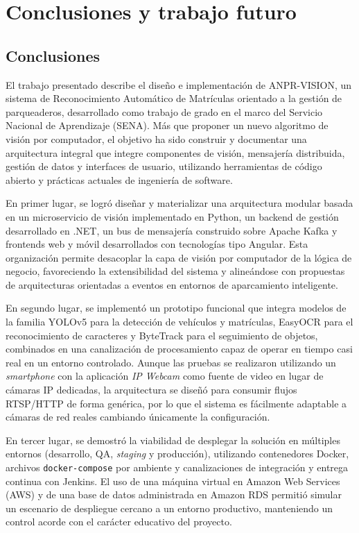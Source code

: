 \section{Conclusiones y trabajo futuro}
\label{sec:conclusiones}

\subsection{Conclusiones}

El trabajo presentado describe el diseño e implementación de ANPR-VISION, un sistema de Reconocimiento Automático de Matrículas orientado a la gestión de parqueaderos, desarrollado como trabajo de grado en el marco del Servicio Nacional de Aprendizaje (SENA). Más que proponer un nuevo algoritmo de visión por computador, el objetivo ha sido construir y documentar una arquitectura integral que integre componentes de visión, mensajería distribuida, gestión de datos y interfaces de usuario, utilizando herramientas de código abierto y prácticas actuales de ingeniería de software.

En primer lugar, se logró diseñar y materializar una arquitectura modular basada en un microservicio de visión implementado en Python, un backend de gestión desarrollado en .NET, un bus de mensajería construido sobre Apache Kafka y frontends web y móvil desarrollados con tecnologías tipo Angular. Esta organización permite desacoplar la capa de visión por computador de la lógica de negocio, favoreciendo la extensibilidad del sistema y alineándose con propuestas de arquitecturas orientadas a eventos en entornos de aparcamiento inteligente.

En segundo lugar, se implementó un prototipo funcional que integra modelos de la familia YOLOv5 para la detección de vehículos y matrículas, EasyOCR para el reconocimiento de caracteres y ByteTrack para el seguimiento de objetos, combinados en una canalización de procesamiento capaz de operar en tiempo casi real en un entorno controlado. Aunque las pruebas se realizaron utilizando un \textit{smartphone} con la aplicación \textit{IP Webcam} como fuente de video en lugar de cámaras IP dedicadas, la arquitectura se diseñó para consumir flujos RTSP/HTTP de forma genérica, por lo que el sistema es fácilmente adaptable a cámaras de red reales cambiando únicamente la configuración.

En tercer lugar, se demostró la viabilidad de desplegar la solución en múltiples entornos (desarrollo, QA, \textit{staging} y producción), utilizando contenedores Docker, archivos \texttt{docker-compose} por ambiente y canalizaciones de integración y entrega continua con Jenkins. El uso de una máquina virtual en Amazon Web Services (AWS) y de una base de datos administrada en Amazon RDS permitió simular un escenario de despliegue cercano a un entorno productivo, manteniendo un control acorde con el carácter educativo del proyecto.


